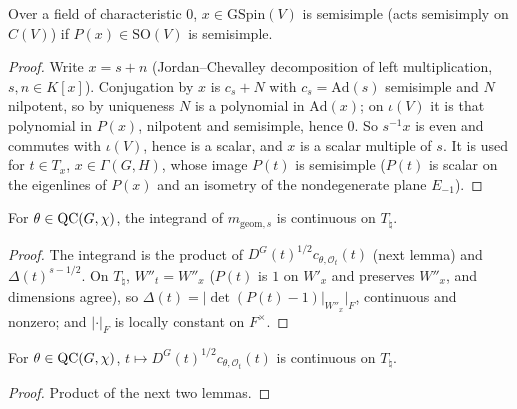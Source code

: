 \begin{lemma}
\label{isSS_of_isSemisimple_specP_baseChange}
\leanok
{}
Over a field of characteristic $0$, $x\in\mathrm{GSpin}(V)$ is semisimple (acts semisimply on $C(V)$) if $P(x)\in\mathrm{SO}(V)$ is semisimple.
\end{lemma}
\begin{proof}
\leanok
Write $x=s+n$ (Jordan--Chevalley decomposition of left multiplication, $s,n\in K[x]$). Conjugation by $x$ is $c_s+N$ with $c_s=\mathrm{Ad}(s)$ semisimple and $N$ nilpotent, so by uniqueness $N$ is a polynomial in $\mathrm{Ad}(x)$; on $\iota(V)$ it is that polynomial in $P(x)$, nilpotent and semisimple, hence $0$. So $s^{-1}x$ is even and commutes with $\iota(V)$, hence is a scalar, and $x$ is a scalar multiple of $s$. It is used for $t\in T_x$, $x\in\Gamma(G,H)$, whose image $P(t)$ is semisimple ($P(t)$ is scalar on the eigenlines of $P(x)$ and an isometry of the nondegenerate plane $E_{-1}$).
\end{proof}

\begin{lemma}
\label{continuousOn_gammaIntegrand_of_mem_QC}
\leanok
{}
For $\theta\in\mathrm{QC}(G,\chi)$, the integrand of $m_{\mathrm{geom},s}$ is continuous on $T_\natural$.
\end{lemma}
\begin{proof}
\leanok
{}
The integrand is the product of $D^G(t)^{1/2}c_{\theta,\mathcal O_t}(t)$ (next lemma) and $\Delta(t)^{s-1/2}$. On $T_\natural$, $W''_t=W''_x$ ($P(t)$ is $1$ on $W'_x$ and preserves $W''_x$, and dimensions agree), so $\Delta(t)=|\det(P(t)-1)|_{W''_x}|_F$, continuous and nonzero; and $|\cdot|_F$ is locally constant on $F^\times$.
\end{proof}

\begin{lemma}
\label{continuousOn_weylDisc_germ_of_mem_QC}
\leanok
{}
For $\theta\in\mathrm{QC}(G,\chi)$, $t\mapsto D^G(t)^{1/2}c_{\theta,\mathcal O_t}(t)$ is continuous on $T_\natural$.
\end{lemma}
\begin{proof}
\leanok
{}
Product of the next two lemmas.
\end{proof}

